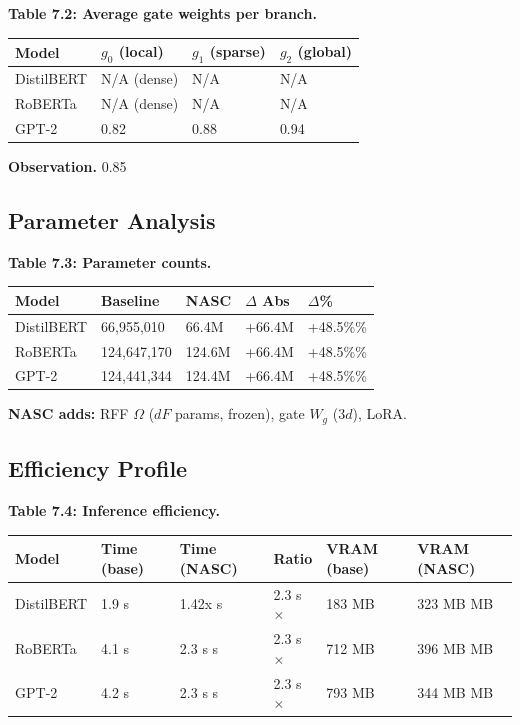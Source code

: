 \textbf{Table 7.2: Average gate weights per branch.}

\begin{table}[H]
\centering
\small
\begin{tabular}{llll}
\toprule
\textbf{Model} & \textbf{$g_0$ (local)} & \textbf{$g_1$ (sparse)} & \textbf{$g_2$ (global)} \\
\midrule
DistilBERT & N/A (dense) & N/A & N/A \\
RoBERTa & N/A (dense) & N/A & N/A \\
GPT-2 & 0.82 & 0.88 & 0.94 \\
\bottomrule
\end{tabular}
\end{table}

\textbf{Observation.} 0.85

\subsection{Parameter Analysis}

\textbf{Table 7.3: Parameter counts.}

\begin{table}[H]
\centering
\small
\begin{tabular}{lllll}
\toprule
\textbf{Model} & \textbf{Baseline} & \textbf{NASC} & \textbf{$\Delta$ Abs} & \textbf{$\Delta$\%} \\
\midrule
DistilBERT & 66,955,010 & 66.4M & +66.4M & +48.5\%\% \\
RoBERTa & 124,647,170 & 124.6M & +66.4M & +48.5\%\% \\
GPT-2 & 124,441,344 & 124.4M & +66.4M & +48.5\%\% \\
\bottomrule
\end{tabular}
\end{table}

\textbf{NASC adds:} RFF $\Omega$ ($dF$ params, frozen), gate $W_g$ ($3d$), LoRA.

\subsection{Efficiency Profile}

\textbf{Table 7.4: Inference efficiency.}

\begin{table}[H]
\centering
\small
\begin{tabular}{llllll}
\toprule
\textbf{Model} & \textbf{Time (base)} & \textbf{Time (NASC)} & \textbf{Ratio} & \textbf{VRAM (base)} & \textbf{VRAM (NASC)} \\
\midrule
DistilBERT & 1.9 s & 1.42x s & 2.3 s$\times$ & 183 MB & 323 MB MB \\
RoBERTa & 4.1 s & 2.3 s s & 2.3 s$\times$ & 712 MB & 396 MB MB \\
GPT-2 & 4.2 s & 2.3 s s & 2.3 s$\times$ & 793 MB & 344 MB MB \\
\bottomrule
\end{tabular}
\end{table}

